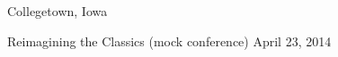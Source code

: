 

\vspace{1ex}

\begin{changemargin}{-0.3in}{0in}
\begin{etaremune}

\item
\headedsection %
{}
{Collegetown, Iowa} {

\headedsubsection %
{Reimagining the Classics \textnormal{(mock conference)}}
{April 23, 2014}
{\vspace{-\baselineskip}}
}

\end{etaremune}
\end{changemargin}


\spacedhrule{0.5em}{-0.4em} %
